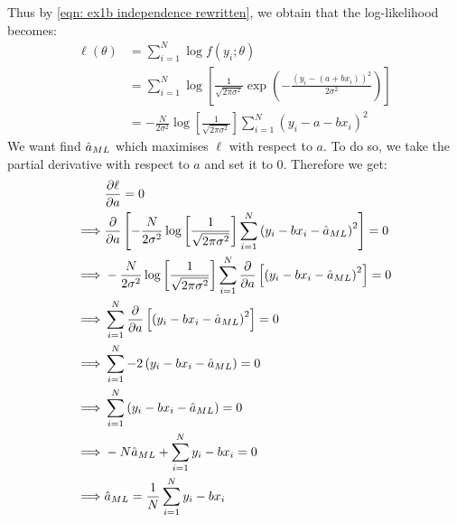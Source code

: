 \documentclass[12pt]{article}
\begin{document}
Thus by \eqref{eqn: ex1b independence rewritten}, we obtain that the log-likelihood becomes:
\begin{align}
    \nonumber
    \ell(\theta)
     & = \sum_{i=1}^N \log f(y_i ; \theta)                                                                                                          \\
    \nonumber
     & = \sum_{i=1}^N \log \left[\frac{1}{\sqrt{2 \pi \sigma^{2}}} \exp \left(-\frac{\left(y_i - (a + bx_i)\right)^{2}}{2 \sigma^{2}}\right)\right] \\
    \label{eqn: ex1 log-likelihood}
     & = -\frac{N}{2 \sigma^2}\log \left[\frac{1}{\sqrt{2 \pi \sigma^{2}}}\right] \sum_{i=1}^N \left(y_i - a - bx_i\right)^{2}
\end{align}
We want find \(\hat a_{ML}\) which maximises \(\ell\) with respect to \(a\). To do so, we take the partial derivative with respect to \(a\) and set it to 0. Therefore we get:
\begin{align*}
             &
    \frac{\partial \ell}{\partial a} = 0                                                                                                                                    \\
    \implies &
    \frac{\partial}{\partial a} \left[-\frac{N}{2 \sigma^2}\log \left[\frac{1}{\sqrt{2 \pi \sigma^{2}}}\right] \sum_{i=1}^N \left(y_i - bx_i - \hat a_{ML} \right)^{2}\right] = 0  \\
    \implies &
    -\frac{N}{2 \sigma^2}\log \left[\frac{1}{\sqrt{2 \pi \sigma^{2}}}\right] \sum_{i=1}^N \frac{\partial}{\partial a} \left[ \left(y_i - bx_i - \hat a_{ML} \right)^{2}\right] = 0 \\
    \implies &
    \sum_{i=1}^N \frac{\partial}{\partial a} \left[ \left(y_i - bx_i - \hat a_{ML} \right)^{2}\right] = 0                                                                          \\
    \implies &
    \sum_{i=1}^N -2 \left(y_i - bx_i - \hat a_{ML} \right) = 0                                                                                                                     \\
    \implies &
    \sum_{i=1}^N \left(y_i - bx_i - \hat a_{ML} \right) = 0                                                                                                                        \\
    \implies &
    - N \hat a_{ML} + \sum_{i=1}^N y_i - bx_i = 0                                                                                                                                  \\
    \implies &
    \hat a_{ML} = \frac{1}{N} \sum_{i=1}^N y_i - bx_i                                                                                                                              \\
\end{align*}
\end{document}
